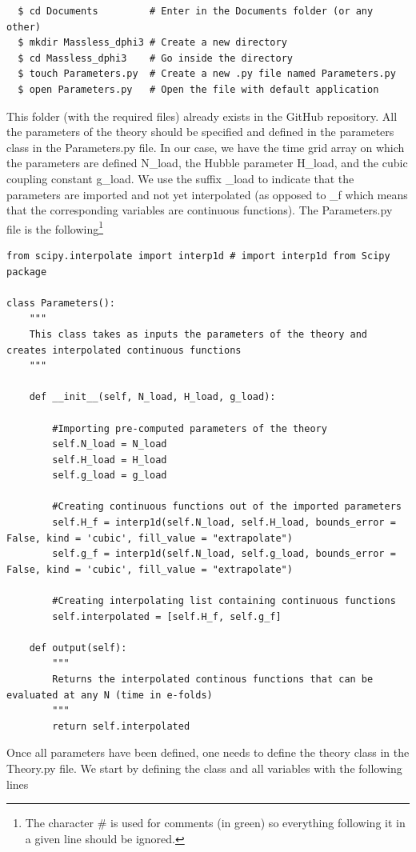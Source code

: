 \documentclass[11pt]{article}
\numberwithin{equation}{section} %
\begin{document}
\begin{eBox}
\begin{verbatim}
  $ cd Documents         # Enter in the Documents folder (or any other)
  $ mkdir Massless_dphi3 # Create a new directory
  $ cd Massless_dphi3    # Go inside the directory
  $ touch Parameters.py  # Create a new .py file named Parameters.py
  $ open Parameters.py   # Open the file with default application
\end{verbatim}
\end{eBox}
This folder (with the required files) already exists in the GitHub repository. All the parameters of the theory should be specified and defined in the \textsf{parameters} class in the \textsf{Parameters.py} file. In our case, we have the time grid array on which the parameters are defined \textsf{N\_load}, the Hubble parameter \textsf{H\_load}, and the cubic coupling constant \textsf{g\_load}. We use the suffix \textsf{\_load} to indicate that the parameters are imported and not yet interpolated (as opposed to \textsf{\_f} which means that the corresponding variables are continuous functions). The \textsf{Parameters.py} file is the following\footnote{The character \# is used for comments (in \textcolor{pygreen}{green}) so everything following it in a given line should be ignored.} 


\begin{lstlisting}
from scipy.interpolate import interp1d # import interp1d from Scipy package

class Parameters():
	"""
	This class takes as inputs the parameters of the theory and creates interpolated continuous functions
	"""

	def __init__(self, N_load, H_load, g_load):

		#Importing pre-computed parameters of the theory
		self.N_load = N_load
		self.H_load = H_load
		self.g_load = g_load

		#Creating continuous functions out of the imported parameters
		self.H_f = interp1d(self.N_load, self.H_load, bounds_error = False, kind = 'cubic', fill_value = "extrapolate")
		self.g_f = interp1d(self.N_load, self.g_load, bounds_error = False, kind = 'cubic', fill_value = "extrapolate")

		#Creating interpolating list containing continuous functions
		self.interpolated = [self.H_f, self.g_f]

	def output(self):
		"""
		Returns the interpolated continous functions that can be evaluated at any N (time in e-folds)
		"""
		return self.interpolated
\end{lstlisting}
Once all parameters have been defined, one needs to define the \textsf{theory} class in the \textsf{Theory.py} file. We start by defining the class and all variables with the following lines
\end{document}
